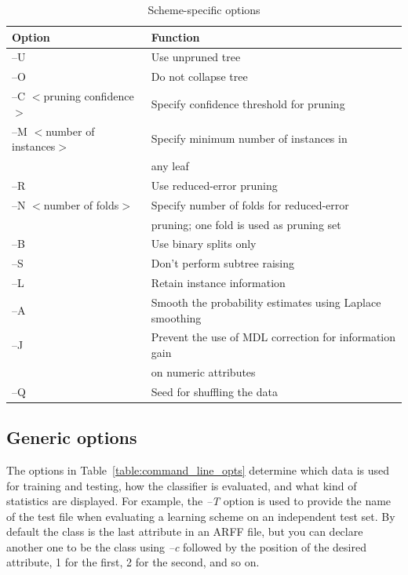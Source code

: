 \begin{table}[thp]
\footnotesize
{\centering \begin{tabular}{ll}
\hline
Option & Function \\
\hline
--U & Use unpruned tree \\
--O & Do not collapse tree \\
--C $<$pruning confidence$>$ & Specify confidence threshold for pruning \\
--M $<$number of instances$>$ & Specify minimum number of instances in \\
& any leaf \\
--R & Use reduced-error pruning \\
--N $<$number of folds$>$ & Specify number of folds for reduced-error \\
& pruning; one fold is used as pruning set \\
--B & Use binary splits only \\
--S & Don't perform subtree raising \\
--L & Retain instance information \\
--A & Smooth the probability estimates using Laplace smoothing \\
--J & Prevent the use of MDL correction for information gain \\
& on numeric attributes \\
--Q & Seed for shuffling the data \\
\hline
\end{tabular} \footnotesize \par}
\caption{\label{table:j48_command_line_opts}Scheme-specific options}
\end{table}

\subsection{Generic options}

The options in Table~\ref{table:command_line_opts} determine which
data is used for training and testing, how the classifier is
evaluated, and what kind of statistics are displayed. For example, the
\textit{--T} option is used to provide the name of the test file when evaluating
a learning scheme on an independent test set. By default the class is
the last attribute in an ARFF file, but you can declare another one to
be the class using \textit{--c} followed by the position of the
desired attribute, 1 for the first, 2 for the second, and so on.

